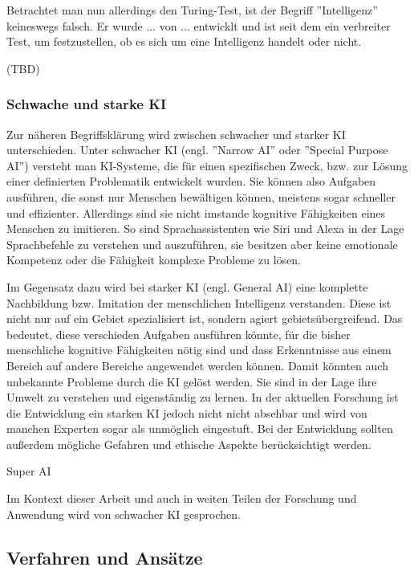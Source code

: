 \documentclass[a4paper,12pt, german]{report}
\begin{document}
Betrachtet man nun allerdings den Turing-Test, ist der Begriff ''Intelligenz'' keineswegs falsch.  Er wurde ... von ... entwicklt und ist seit dem ein verbreiter Test, um festzustellen, ob es sich um eine Intelligenz handelt oder nicht.

(TBD)


\subsubsection{Schwache und starke KI}


Zur näheren Begriffsklärung wird zwischen schwacher und starker KI unterschieden. Unter schwacher KI (engl. ''Narrow AI'' oder ''Special Purpose AI'')  versteht man KI-Systeme, die für einen spezifischen Zweck, bzw. zur Lösung einer definierten Problematik entwickelt wurden. Sie können also Aufgaben ausführen, die sonst nur Menschen bewältigen können, meistens sogar schneller und effizienter. Allerdings sind sie nicht imstande kognitive Fähigkeiten eines Menschen zu imitieren. So sind Sprachassistenten wie Siri und Alexa in der Lage Sprachbefehle zu verstehen und auszuführen, sie besitzen aber keine emotionale Kompetenz oder die Fähigkeit komplexe Probleme zu lösen. \cite{01}\cite{15}


Im Gegensatz dazu wird bei starker KI (engl. General AI) eine komplette Nachbildung bzw. Imitation der menschlichen Intelligenz verstanden. Diese ist nicht nur auf ein Gebiet spezialisiert ist, sondern agiert gebietsübergreifend. Das bedeutet, diese verschieden Aufgaben ausführen könnte, für die bisher menschliche kognitive Fähigkeiten nötig sind und dass Erkenntnisse aus einem Bereich auf andere Bereiche angewendet werden können. Damit könnten auch unbekannte Probleme durch die KI gelöst werden. Sie sind in der Lage ihre Umwelt zu verstehen und eigenständig zu lernen. In der aktuellen Forschung ist die Entwicklung ein starken KI jedoch nicht nicht absehbar und wird von manchen Experten sogar als unmöglich eingestuft. Bei der Entwicklung sollten außerdem mögliche Gefahren und ethische Aspekte berücksichtigt werden. 


Super AI

Im Kontext dieser Arbeit und auch in weiten Teilen der Forschung und Anwendung wird von schwacher KI gesprochen. \cite{01}\cite{15}



\subsection{Verfahren und Ansätze}
\end{document}
